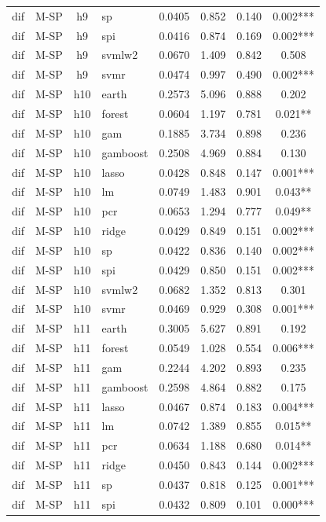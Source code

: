 \begin{ThreePartTable}
\begin{longtable}[t]{llclcccc}
dif & M-SP & h9 & sp & 0.0405 & 0.852 & 0.140 & 0.002***\\
dif & M-SP & h9 & spi & 0.0416 & 0.874 & 0.169 & 0.002***\\
dif & M-SP & h9 & svmlw2 & 0.0670 & 1.409 & 0.842 & 0.508\\
dif & M-SP & h9 & svmr & 0.0474 & 0.997 & 0.490 & 0.002***\\
\addlinespace
dif & M-SP & h10 & earth & 0.2573 & 5.096 & 0.888 & 0.202\\
dif & M-SP & h10 & forest & 0.0604 & 1.197 & 0.781 & 0.021**\\
dif & M-SP & h10 & gam & 0.1885 & 3.734 & 0.898 & 0.236\\
dif & M-SP & h10 & gamboost & 0.2508 & 4.969 & 0.884 & 0.130\\
dif & M-SP & h10 & lasso & 0.0428 & 0.848 & 0.147 & 0.001***\\
dif & M-SP & h10 & lm & 0.0749 & 1.483 & 0.901 & 0.043**\\
dif & M-SP & h10 & pcr & 0.0653 & 1.294 & 0.777 & 0.049**\\
dif & M-SP & h10 & ridge & 0.0429 & 0.849 & 0.151 & 0.002***\\
dif & M-SP & h10 & sp & 0.0422 & 0.836 & 0.140 & 0.002***\\
dif & M-SP & h10 & spi & 0.0429 & 0.850 & 0.151 & 0.002***\\
dif & M-SP & h10 & svmlw2 & 0.0682 & 1.352 & 0.813 & 0.301\\
dif & M-SP & h10 & svmr & 0.0469 & 0.929 & 0.308 & 0.001***\\
\addlinespace
dif & M-SP & h11 & earth & 0.3005 & 5.627 & 0.891 & 0.192\\
dif & M-SP & h11 & forest & 0.0549 & 1.028 & 0.554 & 0.006***\\
dif & M-SP & h11 & gam & 0.2244 & 4.202 & 0.893 & 0.235\\
dif & M-SP & h11 & gamboost & 0.2598 & 4.864 & 0.882 & 0.175\\
dif & M-SP & h11 & lasso & 0.0467 & 0.874 & 0.183 & 0.004***\\
dif & M-SP & h11 & lm & 0.0742 & 1.389 & 0.855 & 0.015**\\
dif & M-SP & h11 & pcr & 0.0634 & 1.188 & 0.680 & 0.014**\\
dif & M-SP & h11 & ridge & 0.0450 & 0.843 & 0.144 & 0.002***\\
dif & M-SP & h11 & sp & 0.0437 & 0.818 & 0.125 & 0.001***\\
dif & M-SP & h11 & spi & 0.0432 & 0.809 & 0.101 & 0.000***\\

\end{longtable}
\end{ThreePartTable}

